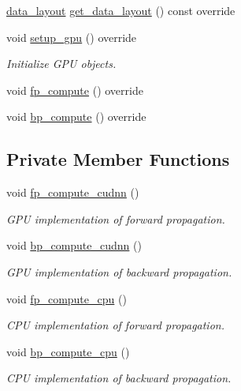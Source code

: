 \begin{DoxyCompactItemize}
\item 
\hyperlink{base_8hpp_a786677cbfb3f5677b4d84f3056eb08db}{data\+\_\+layout} \hyperlink{classlbann_1_1local__response__normalization__layer_a7a161dde860f17264077a0cc4797fe36}{get\+\_\+data\+\_\+layout} () const override
\item 
void \hyperlink{classlbann_1_1local__response__normalization__layer_aff5210d74db5f8302989cca12d04263d}{setup\+\_\+gpu} () override
\begin{DoxyCompactList}\small\item\em Initialize G\+PU objects. \end{DoxyCompactList}\item 
void \hyperlink{classlbann_1_1local__response__normalization__layer_ac7b2ce4970eb7163685fb0a4a69328fc}{fp\+\_\+compute} () override
\item 
void \hyperlink{classlbann_1_1local__response__normalization__layer_ae94544765a459a6609f2c2ebbbc3e9d9}{bp\+\_\+compute} () override
\end{DoxyCompactItemize}
\subsection*{Private Member Functions}
\begin{DoxyCompactItemize}
\item 
void \hyperlink{classlbann_1_1local__response__normalization__layer_a715b08cfc4bfed730a066f6d9cedef86}{fp\+\_\+compute\+\_\+cudnn} ()
\begin{DoxyCompactList}\small\item\em G\+PU implementation of forward propagation. \end{DoxyCompactList}\item 
void \hyperlink{classlbann_1_1local__response__normalization__layer_a78b0d081956abf4f09874d59b4bf4fc8}{bp\+\_\+compute\+\_\+cudnn} ()
\begin{DoxyCompactList}\small\item\em G\+PU implementation of backward propagation. \end{DoxyCompactList}\item 
void \hyperlink{classlbann_1_1local__response__normalization__layer_a79c72491b5b74b64d2b10ac2636cddce}{fp\+\_\+compute\+\_\+cpu} ()
\begin{DoxyCompactList}\small\item\em C\+PU implementation of forward propagation. \end{DoxyCompactList}\item 
void \hyperlink{classlbann_1_1local__response__normalization__layer_a1aac4bf5e2500749bc8bafcd254f5699}{bp\+\_\+compute\+\_\+cpu} ()
\begin{DoxyCompactList}\small\item\em C\+PU implementation of backward propagation. \end{DoxyCompactList}\end{DoxyCompactItemize}

